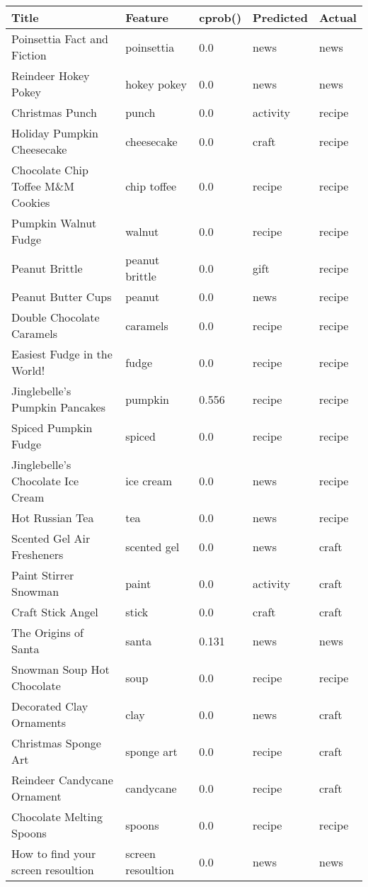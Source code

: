 \documentclass[letterpaper,11pt]{report}
\begin{document}
\begin{savenotes}
\begin{table}[htbp]
	\centering
    \begin{tabular}{|p{8cm}|l|l|l|l|}
    \hline
    \textbf{Title} & \textbf{Feature} & \textbf{cprob()} & \textbf{Predicted} & \textbf{Actual} \\ \hline
Poinsettia Fact and Fiction&poinsettia&0.0&news&news\\ \hline
Reindeer Hokey Pokey&hokey pokey&0.0&news&news\\ \hline
Christmas Punch&punch&0.0&activity&recipe\\ \hline
Holiday Pumpkin Cheesecake&cheesecake&0.0&craft&recipe\\ \hline
Chocolate Chip Toffee M\&M Cookies&chip toffee&0.0&recipe&recipe\\ \hline
Pumpkin Walnut Fudge&walnut&0.0&recipe&recipe\\ \hline
Peanut Brittle&peanut brittle&0.0&gift&recipe\\ \hline
Peanut Butter Cups&peanut&0.0&news&recipe\\ \hline
Double Chocolate Caramels&caramels&0.0&recipe&recipe\\ \hline
Easiest Fudge in the World!&fudge&0.0&recipe&recipe\\ \hline
Jinglebelle’s Pumpkin Pancakes&pumpkin&0.556&recipe&recipe\\ \hline
Spiced Pumpkin Fudge&spiced&0.0&recipe&recipe\\ \hline
Jinglebelle’s Chocolate Ice Cream&ice cream&0.0&news&recipe\\ \hline
Hot Russian Tea&tea&0.0&news&recipe\\ \hline
Scented Gel Air Fresheners&scented gel&0.0&news&craft\\ \hline
Paint Stirrer Snowman&paint&0.0&activity&craft\\ \hline
Craft Stick Angel&stick&0.0&craft&craft\\ \hline
The Origins of Santa&santa&0.131&news&news\\ \hline
Snowman Soup Hot Chocolate&soup&0.0&recipe&recipe\\ \hline
Decorated Clay Ornaments&clay&0.0&news&craft\\ \hline
Christmas Sponge Art&sponge art&0.0&recipe&craft\\ \hline
Reindeer Candycane Ornament&candycane&0.0&recipe&craft\\ \hline
Chocolate Melting Spoons&spoons&0.0&recipe&recipe\\ \hline
How to find your screen resoultion&screen resoultion&0.0&news&news\\ \hline

\end{tabular}
\end{table}
\end{savenotes}
\end{document}
